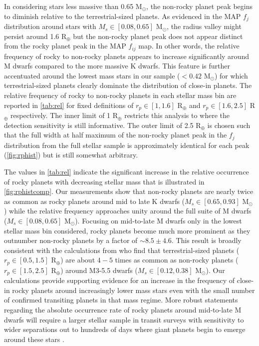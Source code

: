 \documentclass[twocolumn]{emulateapj}
\begin{document}
In considering stars less massive than 0.65 M$_{\odot}$, the non-rocky planet peak begins to diminish relative
to the terrestrial-sized planets. As evidenced in the MAP $f_j$ distribution around stars with
$M_s \in [0.08,0.65]$ M$_{\odot}$, the radius valley might persist around 1.6 R$_{\oplus}$ but the non-rocky planet
peak does not appear distinct from the rocky planet peak in the MAP $f_{ij}$ map. In other words, the relative
frequency of rocky to non-rocky planets appears to increase significantly around M dwarfs compared to the more
massive K dwarfs. This feature is further accentuated around the lowest mass stars in our sample ($<0.42$
M$_{\odot}$) for which terrestrial-sized planets clearly dominate the distribution of close-in planets. The relative
frequency of rocky to non-rocky planets in each stellar mass bin are reported in \autoref{tab:rel}
for fixed definitions of $r_p \in [1,1.6]$ R$_{\oplus}$ and $r_p \in [1.6,2.5]$ R$_{\oplus}$ respectively. The inner
limit of 1 R$_{\oplus}$ restricts this analysis to where the detection sensitivity is still informative. The outer
limit of 2.5 R$_{\oplus}$ is chosen such that the full width at half maximum of the non-rocky planet peak in the
$f_j$ distribution from the full stellar sample is approximately identical for each peak (\autoref{fig:rphist})
but is still somewhat arbitrary.



The values in \autoref{tab:rel} indicate the significant increase in the relative occurrence of rocky
planets with decreasing stellar mass that is illustrated in \autoref{fig:rphistcomp}. Our measurements show
that non-rocky planets are nearly twice as common as rocky planets
around mid to late K dwarfs ($M_s \in [0.65,0.93]$ M$_{\odot}$) while the relative frequency approaches unity
around the full suite of M dwarfs ($M_s \in [0.08,0.65]$ M$_{\odot}$). Focusing on mid-to-late M dwarfs only in
the lowest stellar mass bin considered, rocky planets become much more prominent as they outnumber non-rocky
planets by a factor of $\sim 8.5\pm 4.6$. This result is broadly
consistent with the calculations from \cite{hardegree19} who find that terrestrial-sized 
planets ($r_p \in[0.5,1.5]$ R$_{\oplus}$) are about $4-5$ times as common as non-rocky planets ($r_p \in [1.5,2.5]$
R$_{\oplus}$) around M3-5.5 dwarfs ($M_s \in [0.12,0.38]$ M$_{\odot}$). 
Our calculations provide supporting evidence for an increase in the frequency of close-in rocky planets
around increasingly lower mass stars even with the small number of confirmed transiting planets in that mass
regime. More robust statements regarding the absolute occurrence rate of rocky planets around mid-to-late
M dwarfs will require a larger stellar sample in transit surveys with sensitivity to wider separations out to
hundreds of days where giant planets begin to emerge around these stars \citep{bonfils13,morales19}.
\end{document}
